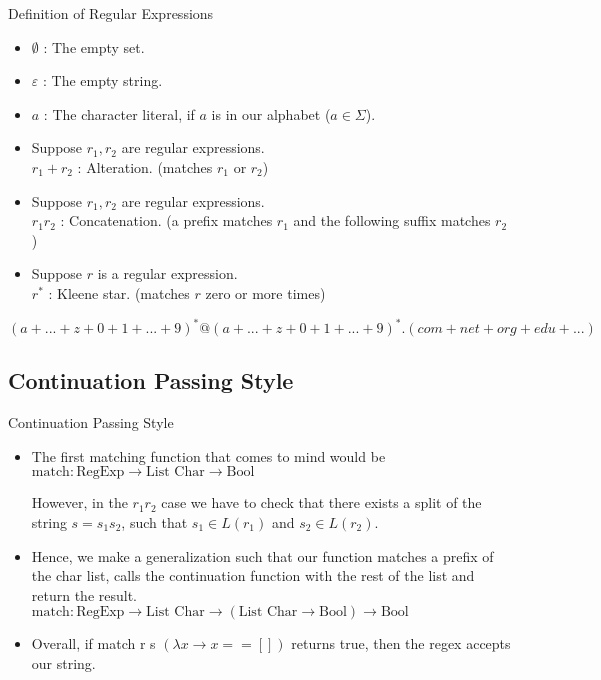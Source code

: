 \documentclass{beamer}
\begin{document}
\begin{frame}{Definition of Regular Expressions}
\begin{itemize}
\item $\emptyset$ : The empty set.
\item $\varepsilon$ : The empty string.
\item $a$ : The character literal, if $a$ is in our alphabet ($a \in \Sigma$).
\item Suppose $r_1, r_2$ are regular expressions.\\
$r_1 + r_2$ : Alteration. (matches $r_1$ or $r_2$)
\item Suppose $r_1, r_2$ are regular expressions.\\
$r_1 r_2$ : Concatenation. (a prefix matches $r_1$ and the following suffix matches $r_2$)
\item Suppose $r$ is a regular expression.\\
$r^*$ : Kleene star. (matches $r$ zero or more times)
\end{itemize}
\begin{example}
$(a + ... + z + 0 + 1 + ... + 9)^* @ (a + ... + z + 0 + 1 + ... + 9)^* . (com + net + org + edu + ...)$
\end{example}
\end{frame}

\subsection{Continuation Passing Style}

\begin{frame}{Continuation Passing Style}
\begin{itemize}
\item The first matching function that comes to mind would be \\
$\text{match} : \text{RegExp} \to \text{List Char} \to \text{Bool}$

However, in the $r_1 r_2$ case we have to check that there exists a split of the string $s = s_1 s_2$, such that $s_1 \in L(r_1)$ and $s_2 \in L(r_2)$.

\item Hence, we make a generalization such that our function matches a prefix of the char list, calls the continuation function with the rest of the list and return the result. \\
$\text{match} : \text{RegExp} \to \text{List Char} \to (\text{List Char} \to \text{Bool}) \to \text{Bool}$

\item Overall, if match r s $(\lambda x \to x == [])$ returns true, then the regex accepts our string.
\end{itemize}
\end{frame}
\end{document}
